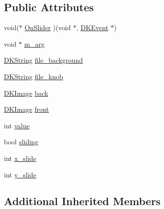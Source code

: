 \subsection*{Public Attributes}
\begin{DoxyCompactItemize}
\item 
void($\ast$ \hyperlink{class_d_k_slider_a5e5a2496f8a2695d531cb0331d9302e1}{On\-Slider} )(void $\ast$, \hyperlink{class_d_k_event}{D\-K\-Event} $\ast$)
\item 
void $\ast$ \hyperlink{class_d_k_slider_a2d1674560d5aae0080de48e546b02286}{m\-\_\-arg}
\item 
\hyperlink{_d_k_string_8h_ac168e8555ceba18e1a2919b21976bc84}{D\-K\-String} \hyperlink{class_d_k_slider_a769c9131da89eb771d3b2e4a59a08c69}{file\-\_\-background}
\item 
\hyperlink{_d_k_string_8h_ac168e8555ceba18e1a2919b21976bc84}{D\-K\-String} \hyperlink{class_d_k_slider_a1f7bcb1775e7f05cf94d6dad1abd1d0d}{file\-\_\-knob}
\item 
\hyperlink{class_d_k_image}{D\-K\-Image} \hyperlink{class_d_k_slider_afe328a7c425bd2312b4c601e765d3a55}{back}
\item 
\hyperlink{class_d_k_image}{D\-K\-Image} \hyperlink{class_d_k_slider_a235aa3e8d55e7bfb9186ea5ba4d1bdd1}{front}
\item 
int \hyperlink{class_d_k_slider_a6c9b163fcbe897529a44673849081a1f}{value}
\item 
bool \hyperlink{class_d_k_slider_a84434d2cd918f667e412276674dda39c}{sliding}
\item 
int \hyperlink{class_d_k_slider_a2e905736e93966591ef3721b34e321b3}{x\-\_\-slide}
\item 
int \hyperlink{class_d_k_slider_addde7705a1c8c259909673c014a993a4}{y\-\_\-slide}
\end{DoxyCompactItemize}
\subsection*{Additional Inherited Members}


